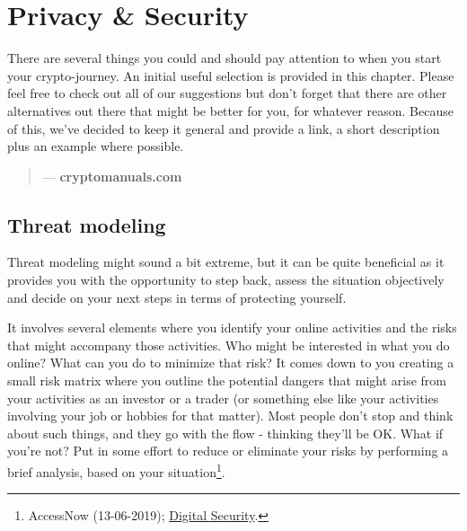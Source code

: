 \chapter{Privacy \& Security}
\label{ch:security}

There are several things you could and should pay attention to when you start your crypto-journey. An initial useful selection is provided in this chapter. Please feel free to check out all of our suggestions but don't forget that there are other alternatives out there that might be better for you, for whatever reason. Because of this, we've decided to keep it general and provide a link, a short description plus an example where possible.

\begin{quotation}

      \textit{}
      \begin{flushright}
        \small{--- \textbf{cryptomanuals.com}}
      \end{flushright}
    
\end{quotation}


\section{Threat modeling}
Threat modeling might sound a bit extreme, but it can be quite beneficial as it provides you with the opportunity to step back, assess the situation objectively and decide on your next steps in terms of protecting yourself. 

It involves several elements where you identify your online activities and the risks that might accompany those activities. Who might be interested in what you do online? What can you do to minimize that risk? It comes down to you creating a small risk matrix where you outline the potential dangers that might arise from your activities as an investor or a trader (or something else like your activities involving your job or hobbies for that matter). Most people don't stop and think about such things, and they go with the flow - thinking they'll be OK. What if you're not? Put in some effort to reduce or eliminate your risks by performing a brief analysis, based on your situation\footnote{AccessNow (13-06-2019); \href{https://www.accessnow.org/cms/assets/uploads/2019/08/Digital-Security-Start-Booklet-digital-Aug2019.pdf}{Digital Security}.}.

